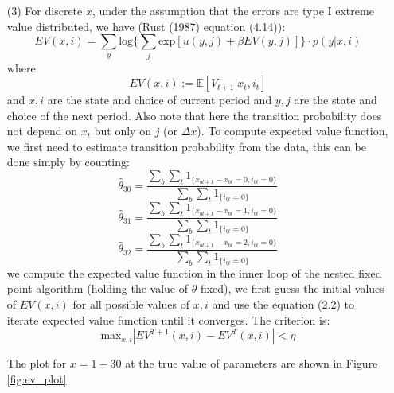 \documentclass[paper=a4, fontsize=11pt]{scrartcl} %
\numberwithin{equation}{section} %
\numberwithin{figure}{section} %
\numberwithin{table}{section} %
\begin{document}
\begin{itemize}
\begin{itemize}
\item[(3)]
For discrete $x$, under the assumption that the errors are type I extreme value distributed, we have (Rust (1987) equation (4.14)):
\[EV(x,i) = \sum_y \text{log} \{\sum_{j} \text{exp}[u(y,j)+\beta EV(y,j)]\}\cdot p(y|x,i)\tag{2.2}\]
where 
\[EV(x,i) := \mathbb{E}[V_{t+1}|x_t,i_t]\] 
and $x, i$ are the state and choice of current period and $y,j$ are the state and choice of the next period. Also note that here the transition probability does not depend on $x_t$ but only on $j$ (or $\Delta x$). To compute expected value function, we first need to estimate transition probability from the data, this can be done simply by counting:
\[\hat{\theta}_{30} = \frac{\sum_{b}\sum_{t} 1_{\{x_{bt+1}-x_{bt}=0, i_{bt}=0\}}}{\sum_{b}\sum_{t} 1_{\{i_{bt}=0\}}}\]
\[\hat{\theta}_{31} = \frac{\sum_{b}\sum_{t} 1_{\{x_{bt+1}-x_{bt}=1, i_{bt}=0\}}}{\sum_{b}\sum_{t} 1_{\{i_{bt}=0\}}}\]
\[\hat{\theta}_{32} = \frac{\sum_{b}\sum_{t} 1_{\{x_{bt+1}-x_{bt}=2, i_{bt}=0\}}}{\sum_{b}\sum_{t} 1_{\{i_{bt}=0\}}}\]
we compute the expected value function in the inner loop of the nested fixed point algorithm (holding the value of $\theta$ fixed), we first guess the initial values of $EV(x,i)$ for all possible values of $x,i$ and use the equation (2.2) to iterate expected value function until it converges. The criterion is:
\[\text{max}_{x,i}|EV^{T+1}(x,i)-EV^T(x,i)|<\eta\]

The plot for $x=1-30$ at the true value of parameters are shown in Figure \ref{fig:ev_plot}.


\end{itemize}
\end{itemize}
\end{document}
